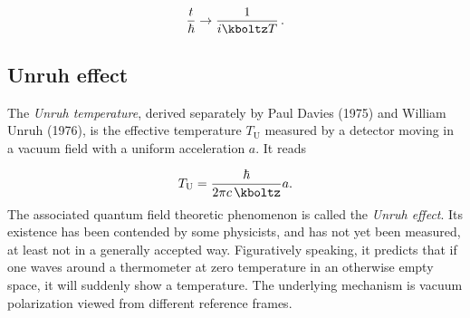 \begin{equation*}
  \frac{t}{\hbar} \rightarrow \frac{1}{i \kboltz T}\,.
\end{equation*}


\subsection*{Unruh effect}

The \emph{Unruh temperature}, derived separately by Paul Davies (1975) and William Unruh (1976), is the effective temperature $T_{\text{U}}$ measured by a detector moving in a vacuum field with a uniform acceleration $a$. It reads

\begin{equation*}\label{eq:Unruh}
  T_{\text{U}}=\frac{\hbar}{2 \pi c\, \kboltz} a.
\end{equation*}
%
The associated quantum field theoretic phenomenon is called the \emph{Unruh effect}. Its existence has been contended by some physicists, and has not yet been measured, at least not in a generally accepted way. Figuratively speaking, it predicts that if one waves around a thermometer at zero temperature in an otherwise empty space, it will suddenly show a temperature. The underlying mechanism is vacuum polarization viewed from different reference frames.
